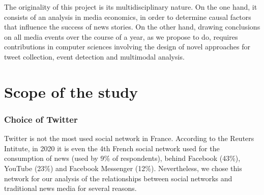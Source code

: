 The originality of this project is its multidisciplinary nature. On the one hand, it consists of an analysis in media economics, in order to determine causal factors that influence the success of news stories. On the other hand, drawing conclusions on all media events over the course of a year, as we propose to do, requires contributions in computer sciences involving the design of novel approaches for tweet collection, event detection and multimodal analysis. 


\section{Scope of the study}
\subsubsection{Choice of Twitter}

	
	Twitter is not the most used social network in France. According to the Reuters Intitute, in 2020 it is even the 4th French social network used for the consumption of news (used by 9\% of respondents), behind Facebook (43\%), YouTube (23\%) and Facebook Messenger (12\%). Nevertheless, we chose this network for our analysis of the relationships between social networks and traditional news media for several reasons. 

